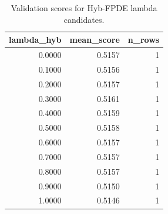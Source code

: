 \begin{table}[t]
\caption{Validation scores for Hyb-FPDE lambda candidates.}
\label{tab:lambda_distribution_computed}
\centering
\begin{tabular}{rrr}
\toprule
lambda\_hyb & mean\_score & n\_rows \\
\midrule
0.0000 & 0.5157 & 1 \\
0.1000 & 0.5156 & 1 \\
0.2000 & 0.5157 & 1 \\
0.3000 & 0.5161 & 1 \\
0.4000 & 0.5159 & 1 \\
0.5000 & 0.5158 & 1 \\
0.6000 & 0.5157 & 1 \\
0.7000 & 0.5157 & 1 \\
0.8000 & 0.5157 & 1 \\
0.9000 & 0.5150 & 1 \\
1.0000 & 0.5146 & 1 \\
\bottomrule
\end{tabular}

\end{table}
